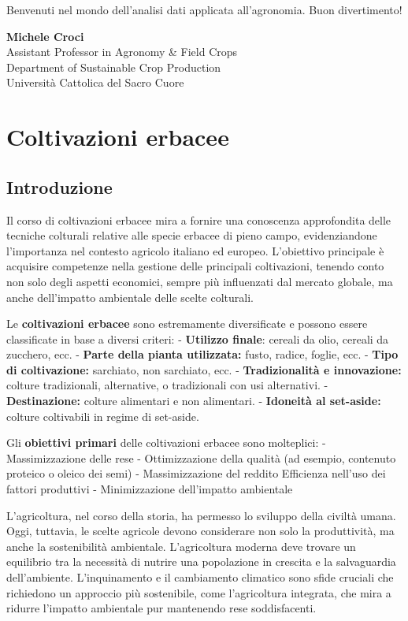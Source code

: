 \documentclass[
]{book}
\begin{document}
Benvenuti nel mondo dell'analisi dati applicata all'agronomia. Buon
divertimento!

\textbf{Michele Croci}\\
Assistant Professor in Agronomy \& Field Crops\\
Department of Sustainable Crop Production\\
Università Cattolica del Sacro Cuore

\hypertarget{coltivazioni-erbacee}{%
\chapter{Coltivazioni erbacee}\label{coltivazioni-erbacee}}

\hypertarget{introduzione}{%
\section{Introduzione}\label{introduzione}}

Il corso di coltivazioni erbacee mira a fornire una conoscenza
approfondita delle tecniche colturali relative alle specie erbacee di
pieno campo, evidenziandone l'importanza nel contesto agricolo italiano
ed europeo. L'obiettivo principale è acquisire competenze nella gestione
delle principali coltivazioni, tenendo conto non solo degli aspetti
economici, sempre più influenzati dal mercato globale, ma anche
dell'impatto ambientale delle scelte colturali.

Le \textbf{coltivazioni erbacee} sono estremamente diversificate e
possono essere classificate in base a diversi criteri: -
\textbf{Utilizzo finale}: cereali da olio, cereali da zucchero, ecc. -
\textbf{Parte della pianta utilizzata:} fusto, radice, foglie, ecc. -
\textbf{Tipo di coltivazione:} sarchiato, non sarchiato, ecc. -
\textbf{Tradizionalità e innovazione:} colture tradizionali,
alternative, o tradizionali con usi alternativi. -
\textbf{Destinazione:} colture alimentari e non alimentari. -
\textbf{Idoneità al set-aside:} colture coltivabili in regime di
set-aside.

Gli \textbf{obiettivi primari} delle coltivazioni erbacee sono
molteplici: - Massimizzazione delle rese - Ottimizzazione della qualità
(ad esempio, contenuto proteico o oleico dei semi) - Massimizzazione del
reddito Efficienza nell'uso dei fattori produttivi - Minimizzazione
dell'impatto ambientale

L'agricoltura, nel corso della storia, ha permesso lo sviluppo della
civiltà umana. Oggi, tuttavia, le scelte agricole devono considerare non
solo la produttività, ma anche la sostenibilità ambientale.
L'agricoltura moderna deve trovare un equilibrio tra la necessità di
nutrire una popolazione in crescita e la salvaguardia dell'ambiente.
L'inquinamento e il cambiamento climatico sono sfide cruciali che
richiedono un approccio più sostenibile, come l'agricoltura integrata,
che mira a ridurre l'impatto ambientale pur mantenendo rese
soddisfacenti.
\end{document}
